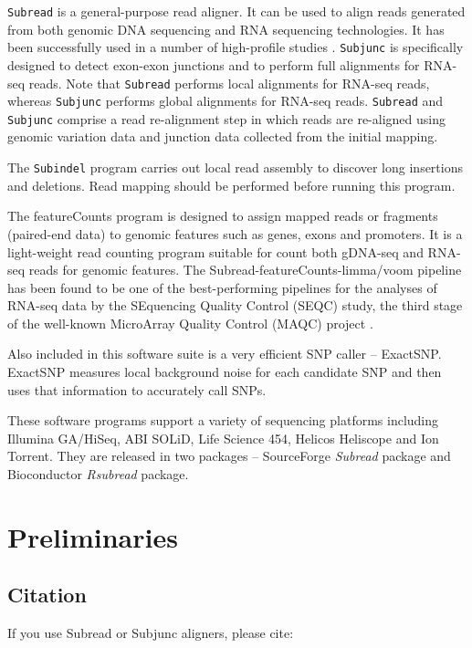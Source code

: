\documentclass[12pt]{report}
\newcommand{\code}[1]{{\small\texttt{#1}}}
\newcommand{\Subread}{\textsf{Subread}}
\newcommand{\Subjunc}{\textsf{Subjunc}}
\newcommand{\ExactSNP}{\textsf{ExactSNP}}
\newcommand{\featureCounts}{\textsf{featureCounts}}
\begin{document}
\code{Subread} is a general-purpose read aligner.
It can be used to align reads generated from both genomic DNA sequencing and RNA sequencing technologies.
It has been successfully used in a number of high-profile studies \cite{TangNC2013,ManNI2013,SpangenbergSCR2013,tang,ezh2}.
\code{Subjunc} is specifically designed to detect exon-exon junctions and to perform full alignments for RNA-seq reads.
Note that \code{Subread} performs local alignments for RNA-seq reads, whereas \code{Subjunc} performs global alignments for RNA-seq reads.
\code{Subread} and \code{Subjunc} comprise a read re-alignment step in which reads are re-aligned using genomic variation data and junction data collected from the initial mapping.

The \code{Subindel} program carries out local read assembly to discover long insertions and deletions.
Read mapping should be performed before running this program.

The {\featureCounts} program is designed to assign mapped reads or fragments (paired-end data) to genomic features such as genes, exons and promoters.
It is a light-weight read counting program suitable for count both gDNA-seq and RNA-seq reads for genomic features\cite{fcounts}.
The \textsf{Subread-featureCounts-limma/voom} pipeline has been found to be one of the best-performing pipelines for the analyses of RNA-seq data by the SEquencing Quality Control (SEQC) study, the third stage of the well-known MicroArray Quality Control (MAQC) project \cite{seqc}.

Also included in this software suite is a very efficient SNP caller -- {\ExactSNP}.
{\ExactSNP} measures local background noise for each candidate SNP and then uses that information to accurately call SNPs.

These software programs support a variety of sequencing platforms including Illumina GA/HiSeq, ABI SOLiD, Life Science 454, Helicos Heliscope and Ion Torrent. They are released in two packages -- SourceForge \emph{Subread} package and Bioconductor \emph{Rsubread} package.

\chapter{Preliminaries}

\section{Citation}

If you use {\Subread} or {\Subjunc} aligners, please cite:
\end{document}
